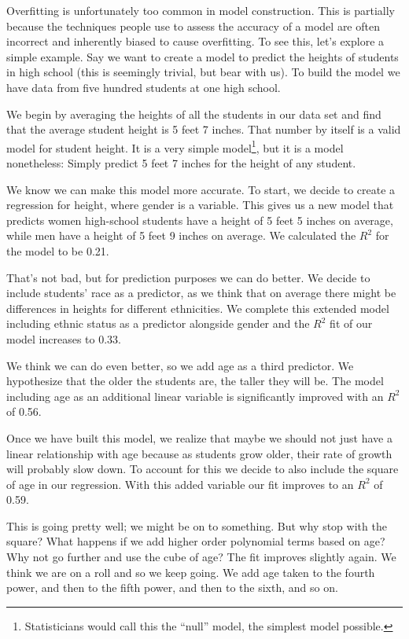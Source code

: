 \documentclass[]{memoir}
\begin{document}
Overfitting is unfortunately too common in model construction. This is
partially because the techniques people use to assess the accuracy of a
model are often incorrect and inherently biased to cause overfitting. To
see this, let's explore a simple example. Say we want to create a model
to predict the heights of students in high school (this is seemingly
trivial, but bear with us). To build the model we have data from five
hundred students at one high school.

We begin by averaging the heights of all the students in our data set
and find that the average student height is 5 feet 7 inches. That number
by itself is a valid model for student height. It is a very simple
model\footnote{Statisticians would call this the ``null'' model, the
  simplest model possible.}, but it is a model nonetheless: Simply
predict 5 feet 7 inches for the height of any student.

We know we can make this model more accurate. To start, we decide to
create a regression for height, where gender is a variable. This gives
us a new model that predicts women high-school students have a height of
5 feet 5 inches on average, while men have a height of 5 feet 9 inches
on average. We calculated the $R^2$ for the model to be 0.21.

That's not bad, but for prediction purposes we can do better. We decide
to include students' race as a predictor, as we think that on average
there might be differences in heights for different ethnicities. We
complete this extended model including ethnic status as a predictor
alongside gender and the $R^2$ fit of our model increases to 0.33.

We think we can do even better, so we add age as a third predictor. We
hypothesize that the older the students are, the taller they will be.
The model including age as an additional linear variable is
significantly improved with an $R^2$ of 0.56.

Once we have built this model, we realize that maybe we should not just
have a linear relationship with age because as students grow older,
their rate of growth will probably slow down. To account for this we
decide to also include the square of age in our regression. With this
added variable our fit improves to an $R^2$ of 0.59.

This is going pretty well; we might be on to something. But why stop
with the square? What happens if we add higher order polynomial terms
based on age? Why not go further and use the cube of age? The fit
improves slightly again. We think we are on a roll and so we keep going.
We add age taken to the fourth power, and then to the fifth power, and
then to the sixth, and so on.
\end{document}
